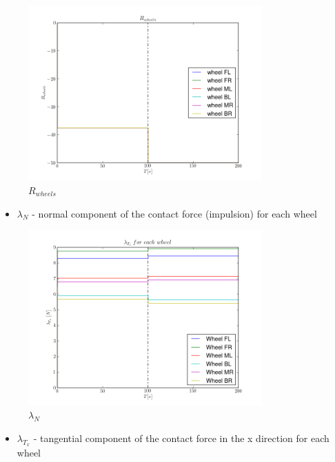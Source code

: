 \begin{figure}[H]
  \centering
    \includegraphics[width=0.8\textwidth]{pWHEELS4}
  \caption{$R_{wheels}$}
\end{figure}

\begin{itemize}
  \item $\lambda_{N}$ - normal component of the contact force (impulsion) for each wheel
\end{itemize}

\begin{figure}[H]
  \centering
    \includegraphics[width=0.8\textwidth]{lambdaN4}
  \caption{$\lambda_N$}
\end{figure}

\begin{itemize}
  \item $\lambda_{T_x}$ - tangential component of the contact force in the x direction for each wheel
\end{itemize}

